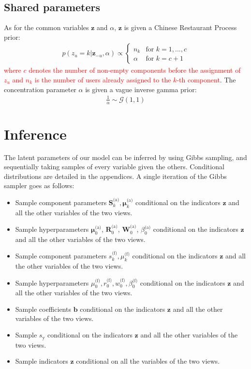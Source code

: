 \documentclass[smallextended]{svjour3}          %
\newcommand\alberto[1]{\textcolor{red}{#1}}
\newcommand{\Muo}{\boldsymbol{\mu}_{0}^\text{(a)}}
\newcommand{\Ro}{\mathbf{R}_{0}^\text{(a)}}
\newcommand{\Wo}{\mathbf{W}_{0}^\text{(a)}}
\newcommand{\betaoa}{\beta_{0}^\text{(a)}}
\newcommand{\muo}{\mu_{0}^\text{(f)}}
\newcommand{\ro}{r_{0}^\text{(f)}}
\newcommand{\wo}{w_{0}^\text{(f)}}
\newcommand{\betaof}{\beta_{0}^\text{(f)}}
\newcommand{\Muk}{\boldsymbol{\mu}_{k}^\text{(a)}}
\newcommand{\Sk}{\mathbf{S}_{k}^\text{(a)}}
\newcommand{\muk}{\mu_{k}^\text{(f)}}
\newcommand{\sk}{s_{k}^\text{(f)}}
\begin{document}
\subsection{Shared parameters}\label{sec:sharedparams}
As for the common variables $\mathbf{z}$ and $\alpha$, $\mathbf{z}$ is given a Chinese Restaurant Process prior:
\begin{align}
\label{eq:prior_z_CRP}
p(z_u = k | \mathbf{z}_{-u}, \alpha) \propto 
\begin{cases}
n_{k} & \text{for } k=1,...,c\\
\alpha & \text{for } k=c+1
\end{cases}
\end{align}
\alberto{where $c$ denotes the number of non-empty components before the assignment of $z_u$ and $n_k$ is the number of users already assigned to the $k$-th component}. The concentration parameter $\alpha$ is given a vague inverse gamma prior:
\begin{align*}
\frac{1}{\alpha} \sim \mathcal{G}(1,1)
\end{align*}



\section{Inference}\label{sec:inference}
The latent parameters of our model can be inferred by using Gibbs sampling, and sequentially taking samples of every variable given the others. Conditional distributions are detailed in the appendices. A single iteration of the Gibbs sampler goes as follows: 

\begin{itemize}
\item Sample component parameters $\Sk, \Muk$ conditional on the indicators $\mathbf{z}$ and all the other variables of the two views.
\item Sample hyperparameters $\Muo$, $\Ro$, $\Wo$, $\betaoa$ conditional on  the indicators $\mathbf{z}$ and all the other variables of the two views.
\item Sample component parameters $\sk, \muk$ conditional on the indicators $\mathbf{z}$ and all the other variables of the two views.
\item Sample hyperparameters $\muo, \ro, \wo, \betaof$ conditional on the indicators $\mathbf{z}$ and all the other variables of the two views.
\item Sample coefficients $\mathbf{b}$ conditional on the indicators $\mathbf{z}$ and all the other variables of the two views.
\item Sample $s_{\text{y}}$ conditional on the indicators $\mathbf{z}$ and all the other variables of the two views.
\item Sample indicators $\mathbf{z}$ conditional on all the variables of the two views.
\end{itemize} 
\end{document}
